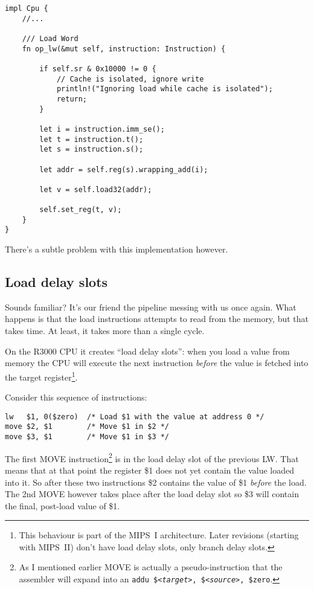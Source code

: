 \documentclass[a4paper]{article}
\newcommand{\code}[1] {\texttt{#1}}
\begin{document}
\begin{lstlisting}
impl Cpu {
    //...

    /// Load Word
    fn op_lw(&mut self, instruction: Instruction) {

        if self.sr & 0x10000 != 0 {
            // Cache is isolated, ignore write
            println!("Ignoring load while cache is isolated");
            return;
        }

        let i = instruction.imm_se();
        let t = instruction.t();
        let s = instruction.s();

        let addr = self.reg(s).wrapping_add(i);

        let v = self.load32(addr);

        self.set_reg(t, v);
    }
}
\end{lstlisting}

There's a subtle problem with this implementation however.

\subsection{Load delay slots}

Sounds familiar? It's our friend the pipeline messing with us once
again. What happens is that the load instructions attempts to read
from the memory, but that takes time. At least, it takes more than a
single cycle.

On the R3000 CPU it creates ``load delay slots'': when you load a
value from memory the CPU will execute the next instruction
\emph{before} the value is fetched into the target
register\footnote{This behaviour is part of the MIPS~I
  architecture. Later revisions (starting with MIPS~II) don't
  have load delay slots, only branch delay slots.}.

Consider this sequence of instructions:

\begin{lstlisting}[language=assembly]
lw   $1, 0($zero)  /* Load $1 with the value at address 0 */
move $2, $1        /* Move $1 in $2 */
move $3, $1        /* Move $1 in $3 */
\end{lstlisting}

The first MOVE instruction\footnote{As I mentioned earlier MOVE is
  actually a pseudo-instruction that the assembler will expand into an
  \code{addu \$<\emph{target}>, \$<\emph{source}>, \$zero}.} is in
the load delay slot of the previous LW. That means that at that point
the register \$1 does not yet contain the value loaded into it. So
after these two instructions \$2 contains the value of \$1
\emph{before} the load. The 2nd MOVE however takes place after the
load delay slot so \$3 will contain the final, post-load value of \$1.
\end{document}
